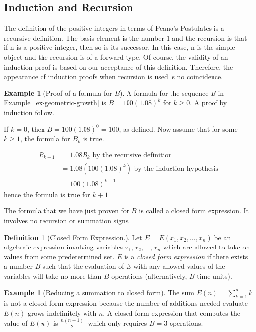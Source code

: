 \documentclass[10pt,]{book}
\theoremstyle{plain}
\theoremstyle{definition}
\newtheorem{definition}[theorem]{Definition}
\theoremstyle{definition}
\theoremstyle{definition}
\newtheorem{example}[theorem]{Example}
\theoremstyle{definition}
\numberwithin{equation}{section}
\begin{document}
\subsection[Induction and Recursion]{Induction and Recursion}\label{ss-induction-and-recursion}
The definition of the positive integers in terms of Peano's Postulates is a recursive definition. The basis element is the number 1
and the recursion is that if n is a positive integer, then so is its successor. In this case, n is the simple object and the recursion is of a forward
type. Of course, the validity of an induction proof is based on our acceptance of this definition. Therefore, the appearance of induction proofs
when recursion is used is no coincidence.%
\begin{example}[Proof of a formula for \(B\)]\label{ex-geometric-squence-proof}
A formula for the sequence \(B\) in \hyperref[ex-geometric-growth]{Example~\ref{ex-geometric-growth}} is \(B = 100(1.08)^k\) for \(k\geq 0\). A proof by induction follow.%
\par
If \(k= 0\), then \(B = 100(1.08)^0 = 100\), as defined. Now assume that for some \(k\geq 1\), the formula for \(B_k\) is true.

\begin{equation*}
\begin{split}
B_{k+1} &= 1.08B_k \textrm{  by the recursive definition}\\
	&=1.08\left(100 (1.08)^k\right) \textrm{  by the induction hypothesis}\\ 
	&= 100 (1.08)^{k+1}
\end{split}
\end{equation*}
hence the formula is true for \(k+1\)%
\par
The formula that we have just proven for \(B\) is called a closed form expression. It involves no recursion or summation signs.%
\end{example}
\begin{definition}[Closed Form Expression.]\label{def-closed-form-expression}
 Let \(E = E\left(x_1, x_2, \ldots ,x_n\right)\) be an algebraic expression involving variables
\(x_1, x_2, \ldots ,x_n\) which are allowed to take on values from some predetermined set. \(E\) is a \textit{ closed form expression} if there exists
a number \(B\) such that the evaluation of \(E\) with any allowed values of the variables will take no more than \(B\) operations (alternatively, \(B\) time units).%
\end{definition}
\begin{example}[Reducing a summation to closed form]\label{ex-summation-simplifed}
The sum \(E(n)=\sum_{k=1}^n k\) is not a closed form expression because the number of additions needed evaluate \(E(n)\) grows indefinitely with \(n\). A closed form expression that computes the value of \(E(n)\) is \(\frac{n(n+1)}{2}\), which only requires \(B=3\) operations. %
\end{example}
\typeout{************************************************}
\typeout{************************************************}
\end{document}
